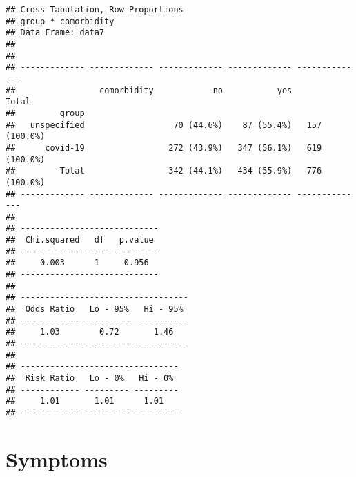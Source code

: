 \documentclass[
]{article}
\begin{document}
\begin{verbatim}
## Cross-Tabulation, Row Proportions  
## group * comorbidity  
## Data Frame: data7  
## 
## 
## ------------- ------------- ------------- ------------- --------------
##                 comorbidity            no           yes          Total
##         group                                                         
##   unspecified                  70 (44.6%)    87 (55.4%)   157 (100.0%)
##      covid-19                 272 (43.9%)   347 (56.1%)   619 (100.0%)
##         Total                 342 (44.1%)   434 (55.9%)   776 (100.0%)
## ------------- ------------- ------------- ------------- --------------
## 
## ----------------------------
##  Chi.squared   df   p.value 
## ------------- ---- ---------
##     0.003      1     0.956  
## ----------------------------
## 
## ----------------------------------
##  Odds Ratio   Lo - 95%   Hi - 95% 
## ------------ ---------- ----------
##     1.03        0.72       1.46   
## ----------------------------------
## 
## --------------------------------
##  Risk Ratio   Lo - 0%   Hi - 0% 
## ------------ --------- ---------
##     1.01       1.01      1.01   
## --------------------------------
\end{verbatim}

\hypertarget{symptoms}{%
\section{Symptoms}\label{symptoms}}
\end{document}
